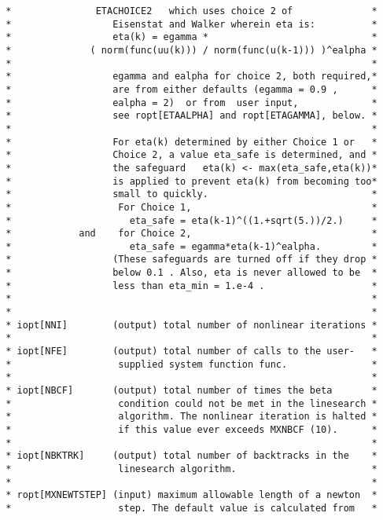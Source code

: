 \documentclass[11pt]{article}
\begin{document}
\begin{verbatim}
 *               ETACHOICE2   which uses choice 2 of              *
 *                  Eisenstat and Walker wherein eta is:          *
 *                  eta(k) = egamma *                             *
 *              ( norm(func(uu(k))) / norm(func(u(k-1))) )^ealpha *
 *                                                                *
 *                  egamma and ealpha for choice 2, both required,*
 *                  are from either defaults (egamma = 0.9 ,      *
 *                  ealpha = 2)  or from  user input,             *
 *                  see ropt[ETAALPHA] and ropt[ETAGAMMA], below. *
 *                                                                *
 *                  For eta(k) determined by either Choice 1 or   *
 *                  Choice 2, a value eta_safe is determined, and *
 *                  the safeguard   eta(k) <- max(eta_safe,eta(k))*
 *                  is applied to prevent eta(k) from becoming too*
 *                  small to quickly.                             *
 *                   For Choice 1,                                *
 *                     eta_safe = eta(k-1)^((1.+sqrt(5.))/2.)     *
 *            and    for Choice 2,                                *
 *                     eta_safe = egamma*eta(k-1)^ealpha.         *
 *                  (These safeguards are turned off if they drop *
 *                  below 0.1 . Also, eta is never allowed to be  *
 *                  less than eta_min = 1.e-4 .                   *
 *                                                                *
 *                                                                *
 * iopt[NNI]        (output) total number of nonlinear iterations *
 *                                                                *
 * iopt[NFE]        (output) total number of calls to the user-   *
 *                   supplied system function func.               *
 *                                                                *
 * iopt[NBCF]       (output) total number of times the beta       *
 *                   condition could not be met in the linesearch *
 *                   algorithm. The nonlinear iteration is halted *
 *                   if this value ever exceeds MXNBCF (10).      *
 *                                                                *
 * iopt[NBKTRK]     (output) total number of backtracks in the    *
 *                   linesearch algorithm.                        *
 *                                                                *
 * ropt[MXNEWTSTEP] (input) maximum allowable length of a newton  *
 *                   step. The default value is calculated from   *

\end{verbatim}
\end{document}
